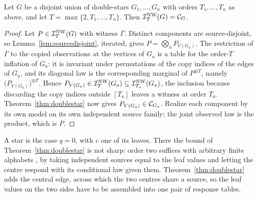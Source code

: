 \begin{corollary}\label{cor:disjointunions}
Let $G$ be a disjoint union of double-stars $G_1,\dots,G_n$ with orders $T_1,\dots,T_n$ as above, and let $T=\max\{2,T_1,\dots,T_n\}$. Then $\mathcal I^{\mathrm{NW}}_T(G)=\mathcal C_{G}$.
\end{corollary}

\begin{proof}
Let $P\in\mathcal I^{\mathrm{NW}}_T(G)$ with witness $\Gamma$. Distinct components are source-disjoint, so Lemma~\ref{lem:sourcedisjoint}, iterated, gives $P=\bigotimes_aP_{V(G_a)}$. The restriction of $\Gamma$ to the copied observations at the vertices of $G_a$ is a table for the order-$T$ inflation of $G_a$: it is invariant under permutations of the copy indices of the edges of $G_a$, and its diagonal law is the corresponding marginal of $P^{\otimes T}$, namely $\bigl(P_{V(G_a)}\bigr)^{\otimes T}$. Hence $P_{V(G_a)}\in\mathcal I^{\mathrm{NW}}_T(G_a)\subseteq\mathcal I^{\mathrm{NW}}_{T_a}(G_a)$, the inclusion because discarding the copy indices outside $[T_a]$ leaves a witness at order $T_a$. Theorem~\ref{thm:doublestar} now gives $P_{V(G_a)}\in\mathcal C_{G_a}$. Realize each component by its own model on its own independent source family; the joint observed law is the product, which is $P$.
\end{proof}

A star is the case $q=0$, with $c$ one of its leaves. There the bound of Theorem~\ref{thm:doublestar} is not sharp: order two suffices with arbitrary finite alphabets \cite[Section 4.1]{NW2020}, by taking independent sources equal to the leaf values and letting the centre respond with its conditional law given them. Theorem~\ref{thm:doublestar} adds the central edge, across which the two centres share a source, so the leaf values on the two sides have to be assembled into one pair of response tables.
